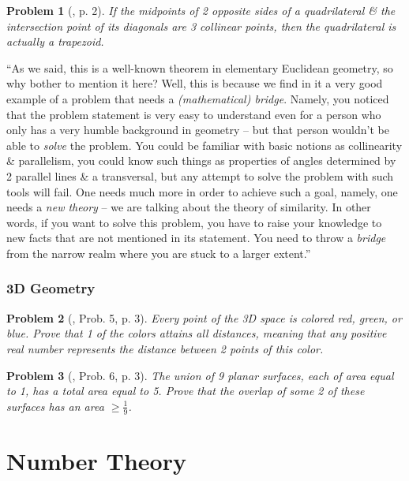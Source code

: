 \documentclass[oneside]{book}
\numberwithin{equation}{section}
\newtheorem{problem}{Problem}[section]
\begin{document}
\begin{problem}[\cite{Andreescu_Mortici_Tetiva2017}, p. 2]
	If the midpoints of 2 opposite sides of a quadrilateral \& the intersection point of its diagonals are 3 collinear points, then the quadrilateral is actually a trapezoid.
\end{problem}
``As we said, this is a well-known theorem in elementary Euclidean geometry, so why bother to mention it here? Well, this is because we find in it a very good example of a problem that needs a \textit{(mathematical) bridge}. Namely, you noticed that the problem statement is very easy to understand even for a person who only has a very humble background in geometry -- but that person wouldn't be able to \textit{solve} the problem. You could be familiar with basic notions as collinearity \& parallelism, you could know such things as properties of angles determined by 2 parallel lines \& a transversal, but any attempt to solve the problem with such tools will fail. One needs much more in order to achieve such a goal, namely, one needs a \textit{new theory} -- we are talking about the theory of similarity. In other words, if you want to solve this problem, you have to raise your knowledge to new facts that are not mentioned in its statement. You need to throw a \textit{bridge} from the narrow realm where you are stuck to a larger extent.''


\section{3D Geometry}

\begin{problem}[\cite{Gelca_Andreescu2017}, Prob. 5, p. 3]
	Every point of the 3D space is colored red, green, or blue. Prove that 1 of the colors attains all distances, meaning that any positive real number represents the distance between 2 points of this color.
\end{problem}

\begin{problem}	[\cite{Gelca_Andreescu2017}, Prob. 6, p. 3]
	The union of 9 planar surfaces, each of area equal to 1, has a total area equal to 5. Prove that the overlap of some 2 of these surfaces has an area $\ge\frac{1}{9}$.
\end{problem}


\part{Number Theory}
\end{document}
